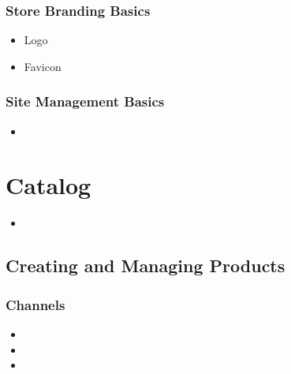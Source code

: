\documentclass[letterpaper,10pt,english]{sphinxmanual}
\begin{document}
\subsubsection{Store Branding Basics}
\label{\detokenize{product/user-guide/README:store-branding-basics}}\begin{itemize}
\item {} 
Logo

\item {} 
Favicon

\end{itemize}


\subsubsection{Site Management Basics}
\label{\detokenize{product/user-guide/README:site-management-basics}}\begin{itemize}
\item {} 

\end{itemize}


\section{Catalog}
\label{\detokenize{product/user-guide/README:catalog}}\begin{itemize}
\item {} 

\end{itemize}


\subsection{Creating and Managing Products}
\label{\detokenize{product/user-guide/README:creating-and-managing-products}}

\subsubsection{Channels}
\label{\detokenize{product/user-guide/README:channels}}\begin{itemize}
\item {} 

\item {} 

\item {} 

\end{itemize}
\end{document}
